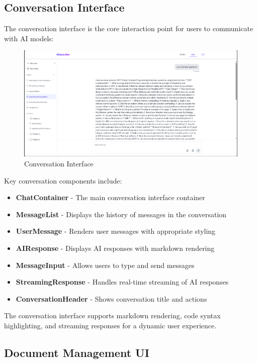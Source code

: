 \subsection{Conversation Interface}

The conversation interface is the core interaction point for users to communicate with AI models:

\begin{figure}[p]
    \centering
    \includegraphics[width=\textwidth]{./Chapter07/figures/conversation_ui.png}
    \caption{Conversation Interface}
    \label{fig:conversation-ui}
\end{figure}
\clearpage

Key conversation components include:

\begin{itemize}
  \item \textbf{ChatContainer} - The main conversation interface container
  \item \textbf{MessageList} - Displays the history of messages in the conversation
  \item \textbf{UserMessage} - Renders user messages with appropriate styling
  \item \textbf{AIResponse} - Displays AI responses with markdown rendering
  \item \textbf{MessageInput} - Allows users to type and send messages
  \item \textbf{StreamingResponse} - Handles real-time streaming of AI responses
  \item \textbf{ConversationHeader} - Shows conversation title and actions
\end{itemize}

The conversation interface supports markdown rendering, code syntax highlighting, and streaming responses for a dynamic user experience.

\subsection{Document Management UI}

